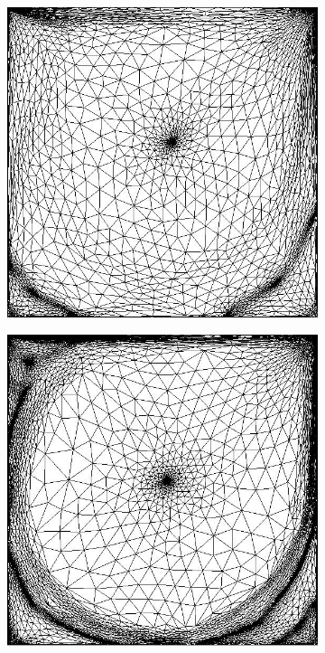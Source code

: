 \begin{figure}[H]
\centering
  \begin{subfigure}[t]{0.3\textwidth}
    \centering
 	\includegraphics[width=\textwidth]{Chapter2/Graphics/remesh4_1000.png}
	\caption{}
  \end{subfigure}
   \begin{subfigure}[t]{0.3\textwidth}
    \centering
	\includegraphics[width=\textwidth]{Chapter2/Graphics/remesh4_10000.png}

\end{subfigure}
\end{figure}

